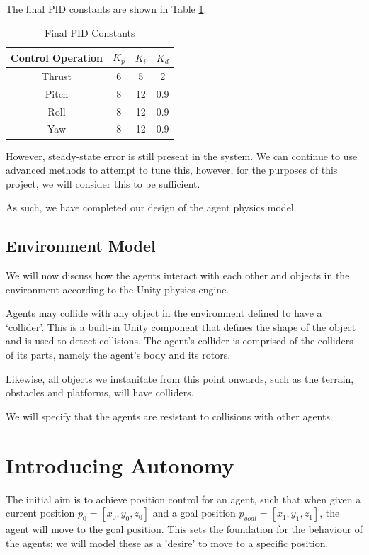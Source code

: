 \documentclass[12pt]{article}
\begin{document}
The final PID constants are shown in Table \ref{tab:pid-final}.

\begin{table}[H]
    \centering
        \begin{tabular}{| c | c | c | c |} 
        \hline
        Control Operation & $K_p$ & $K_i$ & $K_d$ \\ 
        \hline
        Thrust & 6 & 5 & 2 \\
        \hline
        Pitch & 8 & 12 & 0.9 \\
        \hline
        Roll & 8 & 12 & 0.9 \\
        \hline
        Yaw & 8 & 12 & 0.9 \\
        \hline
        \end{tabular}
        \caption{Final PID Constants}
        \label{tab:pid-final}
\end{table}

However, steady-state error is still present in the system. We can continue to use advanced methods to attempt to tune this, however, for the purposes of this project, we will consider this to be sufficient.

As such, we have completed our design of the agent physics model.

\subsection{Environment Model}
We will now discuss how the agents interact with each other and objects in the environment according to the Unity physics engine.

Agents may collide with any object in the environment defined to have a `collider'. This is a built-in Unity component that defines the shape of the object and is used to detect collisions. The agent's collider is comprised of the colliders of its parts, namely the agent's body and its rotors.

Likewise, all objects we instanitate from this point onwards, such as the terrain, obstacles and platforms, will have colliders.

We will specify that the agents are resistant to collisions with other agents.

\newpage
\section{Introducing Autonomy}
The initial aim is to achieve position control for an agent, such that when given a current position $p_0 = [x_0,y_0,z_0]$ and a goal position $p_{goal} = [x_1,y_1,z_1]$, the agent will move to the goal position. This sets the foundation for the behaviour of the agents; we will model these as a 'desire' to move to a specific position.
\end{document}
